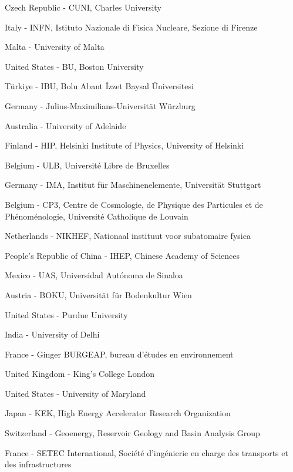 \item[$^{191}$] Czech Republic - CUNI, Charles University
\item[$^{192}$] Italy - INFN, Istituto Nazionale di Fisica Nucleare, Sezione di Firenze
\item[$^{193}$] Malta - University of Malta
\item[$^{194}$] United States - BU, Boston University
\item[$^{195}$] T{\"u}rkiye - IBU, Bolu Abant {\.{I}}zzet Baysal {\"U}niversitesi
\item[$^{196}$] Germany - Julius-Maximilians-Universit{\"a}t W{\"u}rzburg
\item[$^{197}$] Australia - University of Adelaide
\item[$^{198}$] Finland - HIP, Helsinki Institute of Physics, University of Helsinki
\item[$^{199}$] Belgium - ULB, Universit{\'e} Libre de Bruxelles
\item[$^{200}$] Germany - IMA, Institut f{\"u}r Maschinenelemente, Universit{\"a}t Stuttgart
\item[$^{201}$] Belgium - CP3, Centre de Cosmologie, de Physique des Particules et de Ph{\'e}nom{\'e}nologie, Universit{\'e} Catholique de Louvain
\item[$^{202}$] Netherlands - NIKHEF, Nationaal instituut voor subatomaire fysica
\item[$^{203}$] People's Republic of China - IHEP, Chinese Academy of Sciences
\item[$^{204}$] Mexico - UAS, Universidad Aut{\'o}noma de Sinaloa
\item[$^{205}$] Austria - BOKU, Universit{\"a}t f{\"u}r Bodenkultur Wien
\item[$^{206}$] United States - Purdue University
\item[$^{207}$] India - University of Delhi
\item[$^{208}$] France - Ginger BURGEAP, bureau d'{\'e}tudes en environnement
\item[$^{209}$] United Kingdom - King's College London
\item[$^{210}$] United States - University of Maryland
\item[$^{211}$] Japan - KEK, High Energy Accelerator Research Organization
\item[$^{212}$] Switzerland - Geoenergy, Reservoir Geology and Basin Analysis Group
\item[$^{213}$] France - SETEC International, Soci{\'e}t{\'e} d'ing{\'e}nierie en charge des transports et des infrastructures
